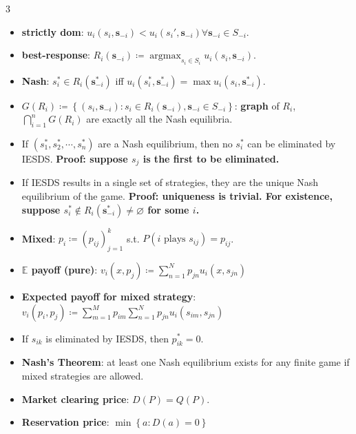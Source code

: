 \documentclass[8pt]{article}
\DeclareMathOperator*{\argmax}{argmax}
\begin{document}
    \begin{multicols*}{3}
        \begin{itemize}
            \setlength\itemsep{0pt}
            \item \textbf{strictly dom}: $u_i(s_i, \bm{s}_{-i}) < u_i(s_i', \bm{s}_{-i})\forall\bm{s}_{-i} \in S_{-i}$.
            \item \textbf{best-response}: $R_i\left(\bm{s}_{-i}\right) \coloneqq \argmax_{s_i \in S_i} u_i\left(s_i, \bm{s}_{-i}\right)$.
            \item \textbf{Nash}: $s_i^* \in R_i\left(\bm{s}^*_{-i}\right)$ iff $u_i\left(s_i^*, \bm{s}_{-i}^*\right) = \max u_i\left(s_i, \bm{s}_{-i}^*\right)$.
            \item $G\left(R_i\right) \coloneqq \left\{\left(s_i, \bm{s}_{-i}\right) \colon s_i \in R_i\left(\bm{s}_{-i}\right), \bm{s}_{-i} \in S_{-i}\right\}$: \textbf{graph} of $R_i$, $\bigcap_{i = 1}^nG\left(R_i\right)$ are exactly all the Nash equilibria.
            \item If $\left(s_1^*, s_2^*, \cdots, s_n^*\right)$ are a Nash equilibrium, then no $s_i^*$ can be eliminated by IESDS. \textbf{Proof: suppose $s_j$ is the first to be eliminated.}
            \item If IESDS results in a single set of strategies, they are the unique Nash equilibrium of the game. \textbf{Proof: uniqueness is trivial. For existence, suppose $s_i^* \notin R_i\left(\bm{s}_{-i}^*\right) \neq \varnothing$ for some $i$.}
            \item \textbf{Mixed}: $p_i \coloneqq \left(p_{ij}\right)_{j = 1}^k$ s.t. $P\left(i \textrm{ plays } s_{ij}\right) = p_{ij}$.
            \item \textbf{$\mathbb{E}$ payoff (pure)}: $v_i\left(x, p_j\right) \coloneqq \sum_{n = 1}^{N}p_{jn}u_i\left(x, s_{jn}\right)$
            \item \textbf{Expected payoff for mixed strategy}: $v_i\left(p_i, p_j\right) \coloneqq \sum_{m = 1}^{M}p_{im}\sum_{n = 1}^{N}p_{jn}u_i\left(s_{im}, s_{jn}\right)$
            \item If $s_{ik}$ is eliminated by IESDS, then $p_{ik}^* = 0$.
            \item \textbf{Nash's Theorem}: at least one Nash equilibrium exists for any finite game if mixed strategies are allowed.
            \item \textbf{Market clearing price}: $D\left(P\right) = Q\left(P\right)$.
            \item \textbf{Reservation price}: $\min\left\{a \colon D\left(a\right) = 0\right\}$

\end{itemize}
\end{multicols*}
\end{document}
